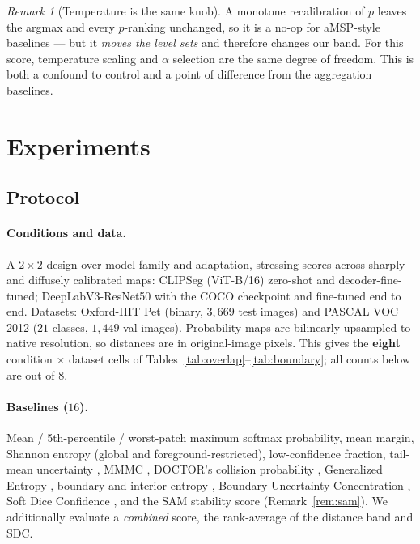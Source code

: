 \documentclass[11pt]{article}
\theoremstyle{remark}
\newtheorem{remark}{Remark}
\begin{document}
\begin{remark}[Temperature is the same knob]
A monotone recalibration of $p$ leaves the argmax and every $p$-ranking unchanged,
so it is a no-op for aMSP-style baselines --- but it \emph{moves the level sets} and
therefore changes our band. For this score, temperature scaling and $\alpha$
selection are the same degree of freedom. This is both a confound to control and a
point of difference from the aggregation baselines.
\end{remark}

\section{Experiments}\label{sec:experiments}

\subsection{Protocol}

\paragraph{Conditions and data.} A $2\times2$ design over model family and
adaptation, stressing scores across sharply and diffusely calibrated maps: CLIPSeg
(ViT-B/16) zero-shot and decoder-fine-tuned; DeepLabV3-ResNet50 with the COCO
checkpoint and fine-tuned end to end. Datasets: Oxford-IIIT Pet (binary,
$3{,}669$ test images) and PASCAL VOC 2012 ($21$ classes, $1{,}449$ val images).
Probability maps are bilinearly upsampled to native resolution, so distances are in
original-image pixels. This gives the \textbf{eight} condition $\times$ dataset
cells of Tables~\ref{tab:overlap}--\ref{tab:boundary}; all counts below are out of
$8$.

\paragraph{Baselines ($16$).} Mean / 5th-percentile / worst-patch maximum softmax
probability, mean margin, Shannon entropy (global and foreground-restricted),
low-confidence fraction, tail-mean uncertainty \cite{values}, MMMC
\cite{holder}, DOCTOR's collision probability \cite{doctor}, Generalized Entropy
\cite{gen}, boundary and interior entropy \cite{metaseg,zenk}, Boundary Uncertainty
Concentration \cite{buc}, Soft Dice Confidence \cite{sdc}, and the SAM stability
score \cite{sam} (Remark~\ref{rem:sam}). We additionally evaluate a \emph{combined}
score, the rank-average of the distance band and SDC.
\end{document}
